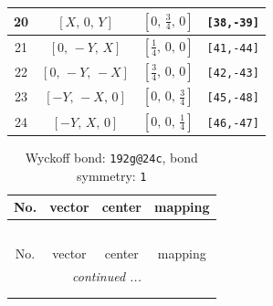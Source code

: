 \documentclass[fleqn,8pt]{jsarticle}
\begin{document}
\begin{longtable}{cccc}
20 & $\left[ X,\, 0,\, Y \right]$ & $\left[ 0,\, \frac{3}{4},\, 0 \right]$ & {\tt [38,-39]} \\ \hline
21 & $\left[ 0,\, - Y,\, X \right]$ & $\left[ \frac{1}{4},\, 0,\, 0 \right]$ & {\tt [41,-44]} \\ \hline
22 & $\left[ 0,\, - Y,\, - X \right]$ & $\left[ \frac{3}{4},\, 0,\, 0 \right]$ & {\tt [42,-43]} \\ \hline
23 & $\left[ - Y,\, - X,\, 0 \right]$ & $\left[ 0,\, 0,\, \frac{3}{4} \right]$ & {\tt [45,-48]} \\ \hline
24 & $\left[ - Y,\, X,\, 0 \right]$ & $\left[ 0,\, 0,\, \frac{1}{4} \right]$ & {\tt [46,-47]} \\
\end{longtable}
\renewcommand{\arraystretch}{1.2}
\begin{longtable}{cccc}
\caption{Wyckoff bond: {\tt 192g@24c}, bond symmetry: {\tt 1}}
 \\
 \hline \hline
No. & vector & center & mapping \\ \hline \endfirsthead

\multicolumn{3}{l}{\tablename\ \thetable{}} \\
 \hline \hline
No. & vector & center & mapping \\ \hline \endhead

 \hline \hline
\multicolumn{3}{r}{\footnotesize\it continued ...} \\ \endfoot

 \hline \hline
\multicolumn{3}{r}{} \\ \endlastfoot


\end{longtable}
\end{document}
